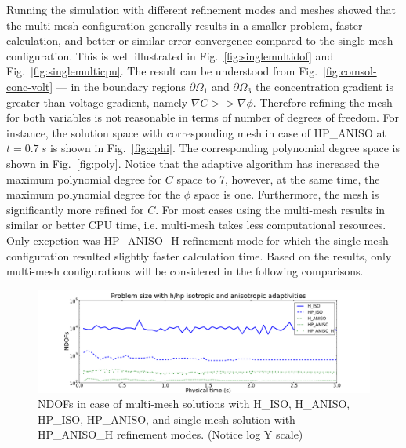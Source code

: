 Running the simulation with different refinement modes 
and meshes showed that the multi-mesh configuration generally results in
a smaller problem, faster calculation, and better or similar error convergence
compared to the single-mesh configuration.
This is well illustrated in Fig.~\ref{fig:singlemultidof} 
and Fig.~\ref{fig:singlemulticpu}.
The result can be understood from Fig.~\ref{fig:comsol-conc-volt} --- in the boundary
regions $\partial \Omega_1$ and $\partial\Omega_3$ the concentration gradient
is greater than voltage gradient, namely $\nabla C >> \nabla \phi$. Therefore
refining the mesh for both variables is not reasonable in terms of
number of degrees of freedom. For instance,
the solution space with corresponding mesh in case of
HP\_ANISO at $t=0.7\ s$ is shown in Fig.~\ref{fig:cphi}. The corresponding polynomial
degree space is shown in Fig.~\ref{fig:poly}. Notice that the adaptive algorithm
has increased the maximum polynomial degree for $C$ space to 7, however,
at the same time, the maximum polynomial degree for the $\phi$ space is one. Furthermore,
the mesh is significantly more refined for $C$.
For most cases using the multi-mesh results in similar or better CPU time, i.e.
multi-mesh takes less computational resources. Only excpetion was HP\_ANISO\_H 
refinement mode for which the single mesh configuration resulted slightly faster
calculation time. 
Based on the results, only multi-mesh configurations will be considered
in the following comparisons.

\begin{figure}[!ht]
  \begin{centering}
  \includegraphics[width=\columnwidth]{isoaniso_dof}
  \caption{\label{fig:isoanisodof} NDOFs in case 
  of multi-mesh solutions with H\_ISO, H\_ANISO,
  HP\_ISO, HP\_ANISO, and single-mesh solution with HP\_ANISO\_H
  refinement modes. (Notice log Y scale)}
  \end{centering}
\end{figure}

